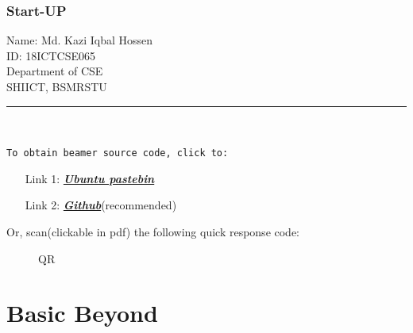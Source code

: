 \documentclass[9 pt]{beamer}
\begin{document}
\begin{frame}
    \frametitle{Start-UP}
    \begin{center}
        Name: Md. Kazi Iqbal Hossen\\
        ID: 18ICTCSE065\\
        Department of CSE\\
        SHIICT, BSMRSTU\\
        \textcolor{green}{\rule{11 cm}{3 pt}} \\
        
        {\footnotesize {}}
    \end{center}
    \vfill
    \texttt{To obtain beamer source code, click to:}
    \begin{itemize}
        \item[Link 1:] \href{https://pastebin.ubuntu.com/p/dY8TWXY24C/}{\textit{\textbf{Ubuntu pastebin}}}
        \item[Link 2:] \href{https://github.com/Sofiullah-Iqbal-Kiron/LaTeX/blob/master/Presentation/Beamer/MAT205\%20Mid/MAT205\%20Mid.tex}{\textit{\textbf{Github}}}{\tiny (recommended)}
    \end{itemize}
    Or, scan{\footnotesize(clickable in pdf)} the following quick response code:
    \begin{figure}
        \caption*{QR} %
        \centering
    \end{figure}
    \transsplitverticalout[duration=2]
\end{frame}


\section{Basic Beyond}
\end{document}
